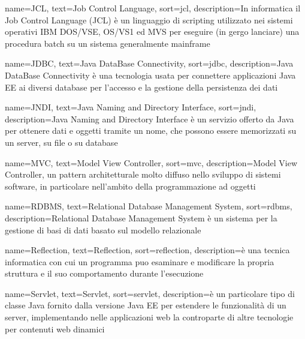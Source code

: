 {
    name=JCL,
    text=Job Control Language,
    sort=jcl,
    description={In informatica il Job Control Language (JCL) è un linguaggio di scripting utilizzato nei sistemi operativi IBM DOS/VSE, OS/VS1 ed MVS per eseguire (in gergo lanciare) una procedura batch su un sistema generalmente mainframe}
}

{
    name=JDBC,
    text=Java DataBase Connectivity,
    sort=jdbc,
    description={Java DataBase Connectivity è una tecnologia usata per connettere applicazioni Java EE ai diversi database per l'accesso e la gestione della persistenza dei dati}
}


{
    name=JNDI,
    text=Java Naming and Directory Interface,
    sort=jndi,
    description={Java Naming and Directory Interface è un servizio offerto da Java per ottenere dati e oggetti tramite un nome, che possono essere memorizzati su un server, su file o su database}
}

{
    name=MVC,
    text=Model View Controller,
    sort=mvc,
    description={Model View Controller, un pattern architetturale molto diffuso nello sviluppo di sistemi software, in particolare nell’ambito della programmazione ad oggetti}
}

{
    name=RDBMS,
    text=Relational Database Management System,
    sort=rdbms,
    description={Relational Database Management System è un sistema per la gestione di basi di dati basato sul modello relazionale}
}


{
    name=Reflection,
    text=Reflection,
    sort=reflection,
    description={è una tecnica informatica con cui un programma puo esaminare e modificare la propria struttura e il suo comportamento durante l'esecuzione}
}

{
    name=Servlet,
    text=Servlet,
    sort=servlet,
    description={è un particolare tipo di classe Java fornito dalla versione Java EE per estendere le funzionalità di un server, implementando nelle applicazioni web la controparte	di altre tecnologie per contenuti web dinamici}
}
